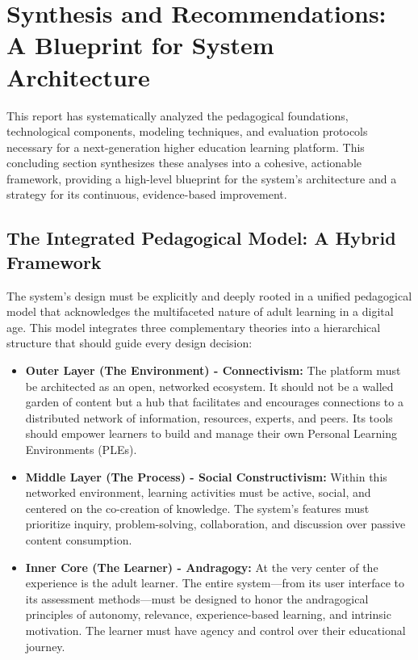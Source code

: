 \documentclass{article}
\begin{document}
\section{Synthesis and Recommendations: A Blueprint for System Architecture}

This report has systematically analyzed the pedagogical foundations, technological components, modeling techniques, and evaluation protocols necessary for a next-generation higher education learning platform. This concluding section synthesizes these analyses into a cohesive, actionable framework, providing a high-level blueprint for the system's architecture and a strategy for its continuous, evidence-based improvement.

\subsection{The Integrated Pedagogical Model: A Hybrid Framework}

The system's design must be explicitly and deeply rooted in a unified pedagogical model that acknowledges the multifaceted nature of adult learning in a digital age. This model integrates three complementary theories into a hierarchical structure that should guide every design decision:

\begin{itemize}
    \item \textbf{Outer Layer (The Environment) - Connectivism:} The platform must be architected as an open, networked ecosystem. It should not be a walled garden of content but a hub that facilitates and encourages connections to a distributed network of information, resources, experts, and peers. Its tools should empower learners to build and manage their own Personal Learning Environments (PLEs).
    \item \textbf{Middle Layer (The Process) - Social Constructivism:} Within this networked environment, learning activities must be active, social, and centered on the co-creation of knowledge. The system's features must prioritize inquiry, problem-solving, collaboration, and discussion over passive content consumption.
    \item \textbf{Inner Core (The Learner) - Andragogy:} At the very center of the experience is the adult learner. The entire system—from its user interface to its assessment methods—must be designed to honor the andragogical principles of autonomy, relevance, experience-based learning, and intrinsic motivation. The learner must have agency and control over their educational journey.
\end{itemize}
\end{document}
